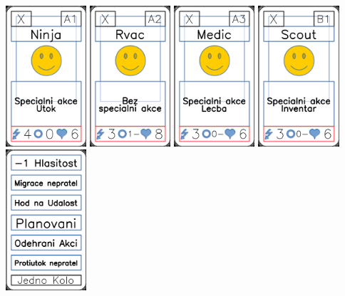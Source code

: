 \documentclass[a4paper]{article}
\begin{document}
	\includegraphics[width=3.0cm]{img-7_0}
	\includegraphics[width=3.0cm]{img-7_1}
	\includegraphics[width=3.0cm]{img-7_2}
	\includegraphics[width=3.0cm]{img-7_3}
	\includegraphics[width=3.0cm]{img-8_0}
\end{document}
